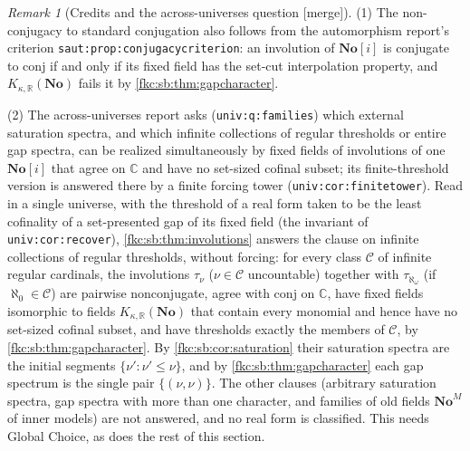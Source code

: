\documentclass[11pt,letterpaper]{article}
\numberwithin{equation}{section}
\theoremstyle{definition}
\theoremstyle{remark}
\newtheorem{remark}[theorem]{Remark}
\newcommand{\R}{\mathbb R}
\newcommand{\C}{\mathbb C}
\newcommand{\No}{\mathbf{No}}
\newcommand{\mergetag}{\textup{\textsf{\small[merge]}}}%
\newcommand{\SC}{\mathbf{No}[i]}
\newcommand{\conj}{\mathrm{conj}}
\newcommand{\KN}[2]{K_{#1,#2}(\No)}%
\newcommand{\lbl}[1]{\nolinkurl{#1}}%
\begin{document}
\begin{remark}[Credits and the across-universes question \mergetag]\label{fkc:sb:rem:univ}
(1) The non-conjugacy to standard conjugation also follows from the automorphism report's criterion \lbl{saut:prop:conjugacycriterion}: an involution of $\SC$ is conjugate to $\conj$ if and only if its fixed field has the set-cut interpolation property, and $\KN\kappa\R$ fails it by \cref{fkc:sb:thm:gapcharacter}.

(2) The across-universes report asks (\lbl{univ:q:families}) which external saturation spectra, and which infinite collections of regular thresholds or entire gap spectra, can be realized simultaneously by fixed fields of involutions of one $\SC$ that agree on $\C$ and have no set-sized cofinal subset; its finite-threshold version is answered there by a finite forcing tower (\lbl{univ:cor:finitetower}). Read in a single universe, with the threshold of a real form taken to be the least cofinality of a set-presented gap of its fixed field (the invariant of \lbl{univ:cor:recover}), \cref{fkc:sb:thm:involutions} answers the clause on infinite collections of regular thresholds, without forcing: for every class $\mathcal C$ of infinite regular cardinals, the involutions $\tau_\nu$ ($\nu\in\mathcal C$ uncountable) together with $\tau_{\aleph_\omega}$ (if $\aleph_0\in\mathcal C$) are pairwise nonconjugate, agree with $\conj$ on $\C$, have fixed fields isomorphic to fields $\KN\kappa\R$ that contain every monomial and hence have no set-sized cofinal subset, and have thresholds exactly the members of $\mathcal C$, by \cref{fkc:sb:thm:gapcharacter}. By \cref{fkc:sb:cor:saturation} their saturation spectra are the initial segments $\{\nu':\nu'\le\nu\}$, and by \cref{fkc:sb:thm:gapcharacter} each gap spectrum is the single pair $\{(\nu,\nu)\}$. The other clauses (arbitrary saturation spectra, gap spectra with more than one character, and families of old fields $\No^M$ of inner models) are not answered, and no real form is classified. This needs Global Choice, as does the rest of this section.


\end{remark}
\end{document}

